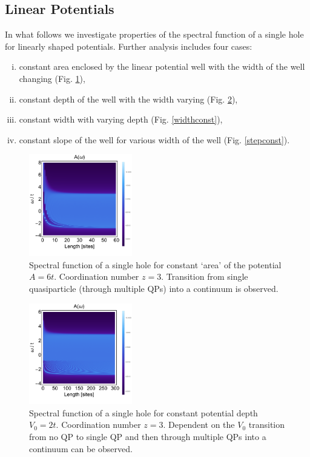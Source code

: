 \documentclass[%
 reprint,
 amsmath,amssymb,
 aps,
prb,
floatfix,
]{revtex4-1}
\begin{document}
\newpage
\subsection{Linear Potentials}

In what follows we investigate properties of the spectral function of a single hole for linearly shaped potentials. Further analysis includes four cases:
\begin{enumerate}[(i)]
\item constant area enclosed by the linear potential well with the width of the well changing (Fig. \ref{areaconst}),
\item constant depth of the well with the width varying (Fig. \ref{V0const}),
\item constant width with varying depth (Fig. \ref{widthconst}),
\item constant slope of the well for various width of the well (Fig. \ref{stepconst}).
\end{enumerate}

\begin{figure}[ht!]
\includegraphics[width=0.4\textwidth]{areaconst}
\caption{Spectral function of a single hole for constant `area' of the potential $A = 6t$. Coordination number $z = 3$. Transition from single quasiparticle (through multiple QPs) into a continuum is observed.}\label{areaconst}
\end{figure}

\begin{figure}[ht!]
\includegraphics[width=0.4\textwidth]{V0const}
    \caption{Spectral function of a single hole for constant potential depth $V_0 = 2t$. Coordination number $z = 3$. Dependent on the $V_0$ transition from no QP to single QP and then through multiple QPs into a continuum can be observed.}\label{V0const}
\end{figure}
\end{document}
